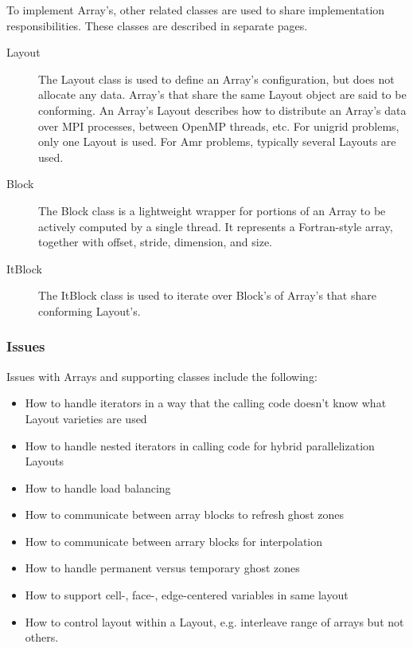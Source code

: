 To implement Array's, other related classes are used to share implementation responsibilities. These classes are described in separate pages.

\begin{description}
\item [Layout] The Layout class is used to define an Array's
  configuration, but does not allocate any data. Array's that share
  the same Layout object are said to be conforming. An Array's Layout
  describes how to distribute an Array's data over MPI processes,
  between OpenMP threads, etc. For unigrid problems, only one Layout
  is used. For Amr problems, typically several Layouts are used.

\item [Block] The Block class is a lightweight wrapper for portions of
  an Array to be actively computed by a single thread. It represents a
  Fortran-style array, together with offset, stride, dimension, and
  size.

\item [ItBlock] The ItBlock class is used to iterate over Block's of
  Array's that share conforming Layout's.
\end{description}

\subsubsection{Issues}

Issues with Arrays and supporting classes include the following:

\begin{itemize}
\item How to handle iterators in a way that the calling code doesn't
  know what Layout varieties are used
\item How to handle nested iterators in calling code for hybrid
  parallelization Layouts
\item How to handle load balancing
\item How to communicate between array blocks to refresh ghost zones
\item How to communicate between arrary blocks for interpolation
\item How to handle permanent versus temporary ghost zones
\item How to support cell-, face-, edge-centered variables in same
  layout
\item How to control layout within a Layout, e.g. interleave range of
  arrays but not others.
\end{itemize}

